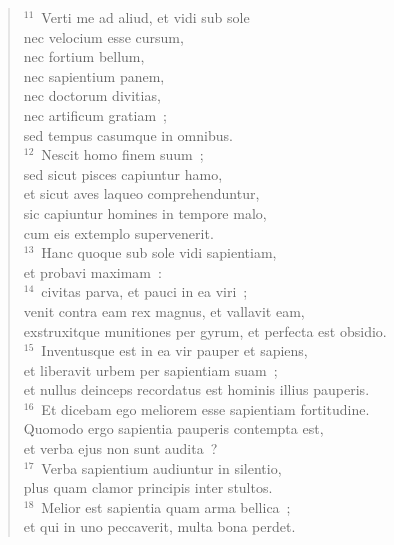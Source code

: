 \begin{flushleft}\begin{verse}${}^{11}$~Verti me ad aliud, et vidi sub sole\\ nec velocium esse cursum,\\ nec fortium bellum,\\ nec sapientium panem,\\ nec doctorum divitias,\\ nec artificum gratiam~;\\ sed tempus casumque in omnibus.\\
${}^{12}$~Nescit homo finem suum~;\\ sed sicut pisces capiuntur hamo,\\ et sicut aves laqueo comprehenduntur,\\ sic capiuntur homines in tempore malo,\\ cum eis extemplo supervenerit.\\
${}^{13}$~Hanc quoque sub sole vidi sapientiam,\\ et probavi maximam~:\\
${}^{14}$~civitas parva, et pauci in ea viri~;\\ venit contra eam rex magnus, et vallavit eam,\\ exstruxitque munitiones per gyrum, et perfecta est obsidio.\\
${}^{15}$~Inventusque est in ea vir pauper et sapiens,\\ et liberavit urbem per sapientiam suam~;\\ et nullus deinceps recordatus est hominis illius pauperis.\\
${}^{16}$~Et dicebam ego meliorem esse sapientiam fortitudine.\\ Quomodo ergo sapientia pauperis contempta est,\\ et verba ejus non sunt audita~?\\
${}^{17}$~Verba sapientium audiuntur in silentio,\\ plus quam clamor principis inter stultos.\\
${}^{18}$~Melior est sapientia quam arma bellica~;\\ et qui in uno peccaverit, multa bona perdet.\end{verse}\end{flushleft}


